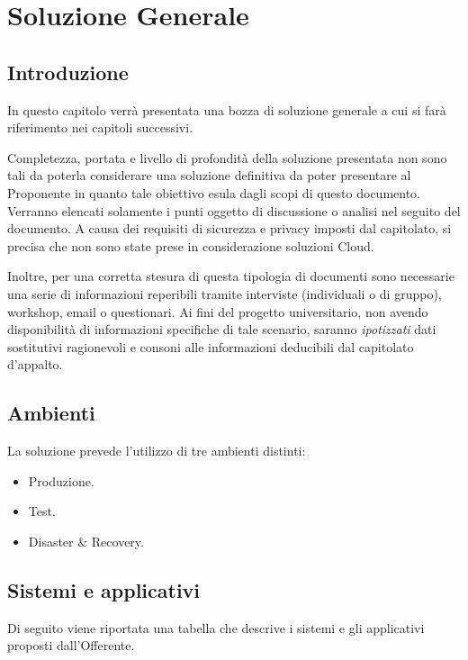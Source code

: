 



\chapter{Soluzione Generale}
\label{cap:introduzione}

	\section{Introduzione}
		In questo capitolo verrà presentata una bozza di soluzione generale a cui si farà riferimento nei capitoli successivi.
        
        
        Completezza, portata e livello di profondità della soluzione presentata non sono tali da poterla considerare una soluzione definitiva da poter presentare al Proponente in quanto tale obiettivo esula dagli scopi di questo documento. Verranno elencati solamente i punti oggetto di discussione o analisi nel seguito del documento.
        A causa dei requisiti di sicurezza e privacy imposti dal capitolato, si precisa che non sono state prese in considerazione soluzioni Cloud.
        
        Inoltre, per una corretta stesura di questa tipologia di documenti sono necessarie una serie di informazioni  reperibili tramite interviste (individuali o di gruppo), workshop, email o questionari. Ai fini del progetto universitario, non avendo disponibilità di informazioni specifiche di tale scenario, saranno \textit{ipotizzati} dati sostitutivi ragionevoli e consoni alle informazioni deducibili dal capitolato d'appalto.
        
	\section{Ambienti}
    	La soluzione prevede l'utilizzo di tre ambienti distinti:
        \begin{itemize}
        	\item Produzione.
            \item Test.
            \item Disaster \& Recovery.
        \end{itemize}
        
	\section{Sistemi e applicativi}
		Di seguito viene riportata una tabella che descrive i sistemi e gli applicativi proposti dall'Offerente.

